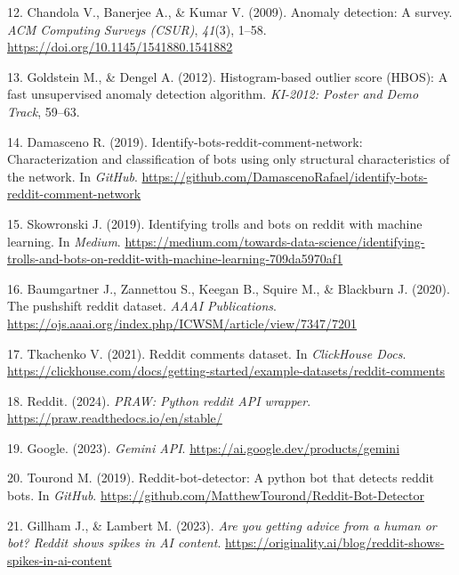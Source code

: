 \documentclass[
  12pt,
  letterpaper,
  DIV=11,
  numbers=noendperiod]{scrartcl}
\newlength{\cslhangindent}
\newenvironment{CSLReferences}[2] %
 {\begin{list}{}{%
  \setlength{\itemindent}{0pt}
  \setlength{\leftmargin}{0pt}
  \setlength{\parsep}{0pt}
  \ifodd #1
   \setlength{\leftmargin}{\cslhangindent}
   \setlength{\itemindent}{-1\cslhangindent}
  \fi
  \setlength{\itemsep}{#2\baselineskip}}}
 {\end{list}}
\begin{document}
\begin{CSLReferences}{1}{0}
12. Chandola V., Banerjee A., \& Kumar V. (2009). Anomaly detection: A
survey. \emph{ACM Computing Surveys (CSUR)}, \emph{41}(3), 1--58.
\url{https://doi.org/10.1145/1541880.1541882}

13. Goldstein M., \& Dengel A. (2012). Histogram-based outlier score
(HBOS): A fast unsupervised anomaly detection algorithm. \emph{KI-2012:
Poster and Demo Track}, 59--63.

14. Damasceno R. (2019). Identify-bots-reddit-comment-network:
Characterization and classification of bots using only structural
characteristics of the network. In \emph{GitHub}.
\url{https://github.com/DamascenoRafael/identify-bots-reddit-comment-network}

15. Skowronski J. (2019). Identifying trolls and bots on reddit with
machine learning. In \emph{Medium}.
\url{https://medium.com/towards-data-science/identifying-trolls-and-bots-on-reddit-with-machine-learning-709da5970af1}

16. Baumgartner J., Zannettou S., Keegan B., Squire M., \& Blackburn J.
(2020). The pushshift reddit dataset. \emph{AAAI Publications}.
\url{https://ojs.aaai.org/index.php/ICWSM/article/view/7347/7201}

17. Tkachenko V. (2021). Reddit comments dataset. In \emph{ClickHouse
Docs}.
\url{https://clickhouse.com/docs/getting-started/example-datasets/reddit-comments}

18. Reddit. (2024). \emph{{PRAW}: Python reddit API wrapper}.
\url{https://praw.readthedocs.io/en/stable/}

19. Google. (2023). \emph{Gemini API}.
\url{https://ai.google.dev/products/gemini}

20. Tourond M. (2019). Reddit-bot-detector: A python bot that detects
reddit bots. In \emph{GitHub}.
\url{https://github.com/MatthewTourond/Reddit-Bot-Detector}

21. Gillham J., \& Lambert M. (2023). \emph{Are you getting advice from
a human or bot? Reddit shows spikes in AI content}.
\url{https://originality.ai/blog/reddit-shows-spikes-in-ai-content}


\end{CSLReferences}
\end{document}
